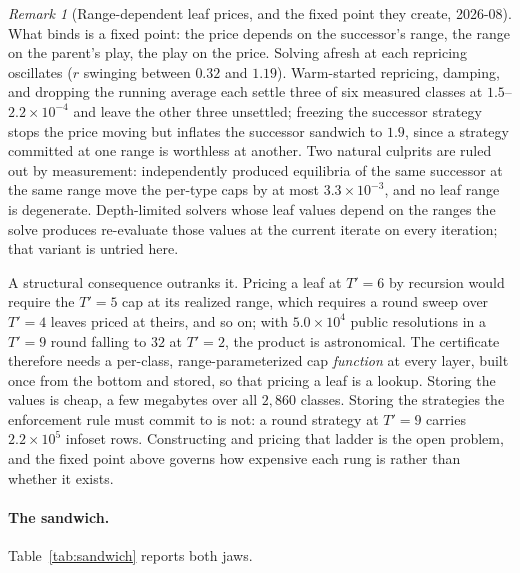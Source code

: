\documentclass[11pt]{article}
\theoremstyle{plain}
\theoremstyle{definition}
\theoremstyle{remark}
\newtheorem{remark}[theorem]{Remark}
\begin{document}
\begin{remark}[Range-dependent leaf prices, and the fixed point they
create, 2026-08]
What binds is a fixed point: the price depends on the successor's range,
the range on the parent's play, the play on the price. Solving afresh at
each repricing oscillates ($r$ swinging between $0.32$ and $1.19$).
Warm-started repricing, damping, and dropping the running average each
settle three of six measured classes at $1.5$--$2.2\times10^{-4}$ and
leave the other three unsettled; freezing the successor strategy stops
the price moving but inflates the successor sandwich to $1.9$, since a
strategy committed at one range is worthless at another. Two natural
culprits are ruled out by measurement: independently produced
equilibria of the same successor at the same range move the per-type
caps by at most $3.3\times10^{-3}$, and no leaf range is degenerate.
Depth-limited solvers whose leaf values depend on the ranges the solve
produces re-evaluate those values at the current iterate on every
iteration; that variant is untried here.

A structural consequence outranks it. Pricing a leaf at $T'{=}6$ by
recursion would require the $T'{=}5$ cap at its realized range, which
requires a round sweep over $T'{=}4$ leaves priced at theirs, and so on;
with $5.0\times10^{4}$ public resolutions in a $T'{=}9$ round falling to
$32$ at $T'{=}2$, the product is astronomical. The certificate therefore
needs a per-class, range-parameterized cap \emph{function} at every
layer, built once from the bottom and stored, so that pricing a leaf is
a lookup. Storing the values is cheap, a few megabytes over all $2{,}860$
classes. Storing the strategies the enforcement rule must commit to is
not: a round strategy at $T'{=}9$ carries $2.2\times10^{5}$ infoset rows.
Constructing and pricing that ladder is the open problem, and the
fixed point above governs how expensive each rung is rather than whether
it exists.
\end{remark}

\paragraph{The sandwich.} Table~\ref{tab:sandwich} reports both jaws.
\end{document}

